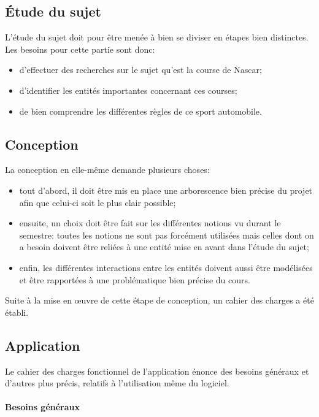 \documentclass[a4paper, 11pt]{article}
\begin{document}
		\subsection{Étude du sujet}
		
		L'étude du sujet doit pour être menée à bien se diviser en étapes bien distinctes. Les besoins pour cette partie sont donc:
		\begin{itemize}
			\item d'effectuer des recherches sur le sujet qu'est la course de Nascar;
			\item d'identifier les entités importantes concernant ces courses;
			\item de bien comprendre les différentes règles de ce sport automobile.
		\end{itemize}
		
		\subsection{Conception}
		
		La conception en elle-même demande plusieurs choses:
		\begin{itemize}
			\item tout d'abord, il doit être mis en place une arborescence bien précise du projet afin que celui-ci soit le plus clair possible;
			\item ensuite, un choix doit être fait sur les différentes notions vu durant le semestre: toutes les notions ne sont pas forcément utilisées mais celles dont on a besoin doivent être reliées à une entité mise en avant dans l'étude du sujet;
			\item enfin, les différentes interactions entre les entités doivent aussi être modélisées et être rapportées à une problématique bien précise du cours. \\
		\end{itemize}
		
		Suite à la mise en œuvre de cette étape de conception, un cahier des charges a été établi.
		
		\subsection{Application}
		
		Le cahier des charges fonctionnel de l'application énonce des besoins généraux et d'autres plus précis, relatifs à l'utilisation même du logiciel.
		
			\paragraph{Besoins généraux}
			
\end{document}
